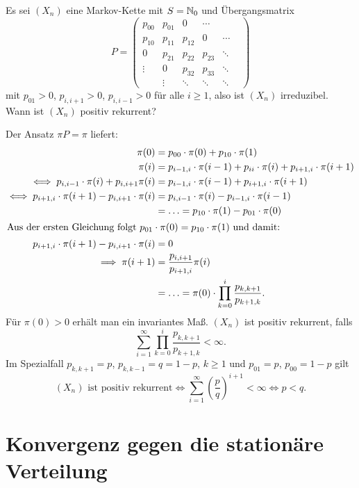 \documentclass[a4paper,twoside,DIV15,BCOR12mm]{scrbook}
\begin{document}
\begin{beispiel}
\label{bsp:3.3}Es sei $(X_n)$ eine Markov-Kette mit $S=\mathbb{N}_0$ und Übergangsmatrix 
\[
P = 
\begin{pmatrix}
p_{00} & p_{01} & 0 & \cdots \\
p_{10} & p_{11} & p_{12} & 0 & \cdots \\
0 & p_{21} & p_{22} & p_{23} & \ddots \\
\vdots & 0 & p_{32} & p_{33}  & \ddots \\
 & \vdots &\ddots & \ddots & \ddots  & 
 \end{pmatrix}
\]
mit $p_{01}>0$, $p_{i,i+1}>0$, $p_{i,i-1}>0$ für alle $i\ge 1$, also ist $(X_n)$ irreduzibel. Wann ist $(X_n)$ positiv rekurrent? 

Der Ansatz $\pi P=\pi$ liefert:
\begin{align*}
\pi(0) &= p_{00} \cdot \pi(0) + p_{10}\cdot \pi(1) \\
\pi(i) &= p_{i-1,i}\cdot \pi(i-1) + p_{ii}\cdot \pi(i) + p_{i+1,i}\cdot\pi(i+1) \\
\iff p_{i,i-1}\cdot \pi(i) + p_{i,i+1} \pi(i) &= p_{i-1,i}\cdot \pi(i-1) + p_{i+1,i} \cdot \pi(i+1) \\
\iff p_{i+1,i}\cdot \pi(i+1) - p_{i,i+1}\cdot \pi(i) &= p_{i,i-1}\cdot \pi(i) - p_{i-1,i}\cdot \pi(i-1) \\
&= \ldots = p_{10}\cdot\pi(1) - p_{01}\cdot\pi(0) \\
\intertext{Aus der ersten Gleichung folgt $p_{01}\cdot\pi(0) = p_{10}\cdot\pi(1)$ und damit:}
p_{i+1,i}\cdot \pi(i+1) - p_{i,i+1}\cdot \pi(i) &= 0 \\
\implies \pi(i+1) &= \frac{p_{i,i+1}}{p_{i+1,i}} \pi(i) \\
&= \ldots = \pi(0) \cdot \prod_{k=0}^i \frac{p_{k,k+1}}{p_{k+1,k}}.
\end{align*}
Für $\pi(0)>0$ erhält man ein invariantes Maß. $(X_n)$ ist positiv rekurrent, falls 
\[
\sum_{i=1}^\infty \prod_{k=0}^i \frac{p_{k,k+1}}{p_{k+1,k}} < \infty.
\]
Im Spezialfall $p_{k,k+1}=p$, $p_{k,k-1}=q=1-p$, $k\ge 1$ und $p_{01} = p$, $p_{00}=1-p$ gilt
\[
\text{$(X_n)$ ist positiv rekurrent} \iff \sum_{i=1}^\infty \left(\frac pq\right)^{i+1} < \infty \iff p<q.
\]

\end{beispiel}

\section{Konvergenz gegen die stationäre Verteilung}
\end{document}
